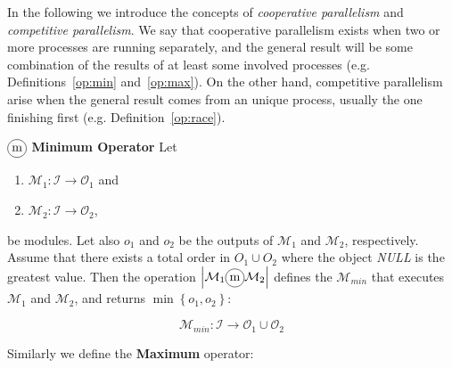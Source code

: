 In the following we introduce the concepts of {\it cooperative parallelism} and {\it competitive parallelism}. We say that cooperative parallelism exists when two or more processes are running separately, and the general result will be some combination of the results of at least some involved processes (e.g. Definitions~\ref{op:min} and~\ref{op:max}). On the other hand, competitive parallelism arise when the general result comes from an unique process, usually the one finishing first (e.g. Definition~\ref{op:race}).


\begin{definition}\label{op:min}
$\circled{m}$ {\bf Minimum Operator } Let
\begin{enumerate}%
	\item $\mathcal{M}_1 : \mathcal{I} \rightarrow \mathcal{O}_1$ and  
	\item $\mathcal{M}_2 : \mathcal{I} \rightarrow \mathcal{O}_2$,
\end{enumerate}%
be modules. %
Let also $o_1$ and $o_2$ be the outputs of $\mathcal{M}_1$ and $\mathcal{M}_2$, respectively. Assume that there exists a total order in $O_1 \cup O_2$ where the object \emph{NULL} is the greatest value. Then the operation $\left|\mathcal{M}_1\circled{m}\mathcal{M}_2\right|$ defines the \cm{} $\mathcal{M}_{min}$ that executes $\mathcal{M}_1$ and $\mathcal{M}_2$, and returns $\min\left\{o_1,o_2\right\}$:

\[
\mathcal{M}_{min}:\mathcal{I} \rightarrow \mathcal{O}_1 \cup \mathcal{O}_2 
\]
\end{definition}

\separation

Similarly we define the \textbf{Maximum} operator:


